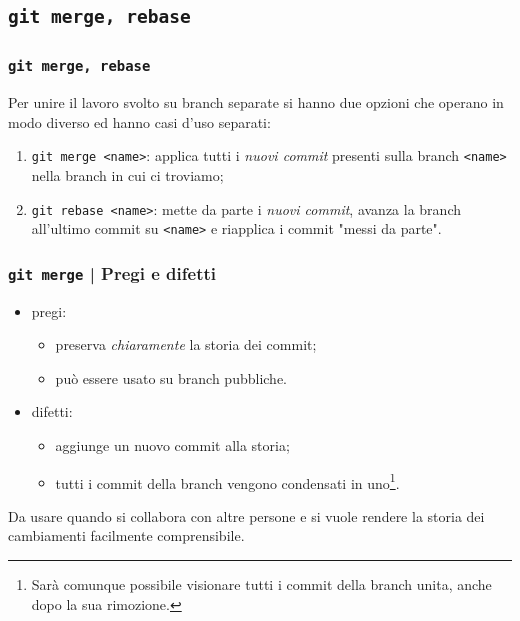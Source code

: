 \documentclass{beamer}
\begin{document}
\subsection{\texttt{git merge, rebase}}
\begin{frame}
  \frametitle{\texttt{git merge, rebase}}
  Per unire il lavoro svolto su branch separate si hanno due opzioni che operano
  in modo diverso ed hanno casi d'uso separati:
  \begin{enumerate}
    \item<1-> \texttt{git merge <name>}: applica tutti i \emph{nuovi commit}\footnotemark{}
      presenti sulla branch \texttt{<name>} nella branch in cui ci troviamo;
    \item<2-> \texttt{git rebase <name>}: mette da parte i
      \emph{nuovi commit}\footnotemark[\value{footnote}], avanza la branch
      all'ultimo commit su \texttt{<name>} e riapplica i commit "messi da parte".
  \end{enumerate}
\end{frame}

\begin{frame}
  \frametitle{\texttt{git merge} | Pregi e difetti}
  \begin{itemize}
    \item pregi: \begin{itemize}
      \item preserva \emph{chiaramente} la storia dei commit;
      \item pu\`o essere usato su branch pubbliche.
    \end{itemize}
    \item difetti: \begin{itemize}
      \item aggiunge un nuovo commit alla storia;
      \item tutti i commit della branch vengono condensati in uno\footnote{
          Sar\`a comunque possibile visionare tutti i commit della branch unita,
          anche dopo la sua rimozione.
        }.
    \end{itemize}
  \end{itemize}

  Da usare quando si collabora con altre persone e si vuole rendere la storia
  dei cambiamenti facilmente comprensibile.
\end{frame}
\end{document}
